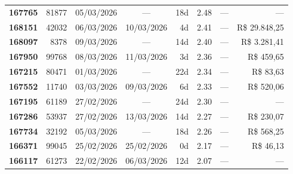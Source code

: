 \documentclass[a4paper,10pt]{article}
\begin{document}
\begin{center}
\begin{longtable}{>{\scriptsize}r>{\scriptsize}r>{\scriptsize}c>{\scriptsize}c>{\scriptsize}r>{\scriptsize}r>{\scriptsize}r>{\scriptsize}r}
\textcolor{anomyellow}{\textbf{167765}} & 81877 & 05/03/2026 & — & 18d & \textcolor{anomyellow}{2.48} & --- & --- \\

\textcolor{anomyellow}{\textbf{168151}} & 42032 & 06/03/2026 & 10/03/2026 & 4d & \textcolor{anomyellow}{2.41} & --- & \textcolor{anomred}{R\$ 29.848,25} \\

\textcolor{anomyellow}{\textbf{168097}} & 8378 & 09/03/2026 & — & 14d & \textcolor{anomyellow}{2.40} & --- & \textcolor{anomred}{R\$ 3.281,41} \\

\textcolor{anomyellow}{\textbf{167950}} & 99768 & 08/03/2026 & 11/03/2026 & 3d & \textcolor{anomyellow}{2.36} & --- & \textcolor{anomred}{R\$ 459,65} \\

\textcolor{anomyellow}{\textbf{167215}} & 80471 & 01/03/2026 & — & 22d & \textcolor{anomyellow}{2.34} & --- & \textcolor{anomred}{R\$ 83,63} \\

\textcolor{anomyellow}{\textbf{167552}} & 11740 & 03/03/2026 & 09/03/2026 & 6d & \textcolor{anomyellow}{2.33} & --- & \textcolor{anomred}{R\$ 520,06} \\

\textcolor{anomyellow}{\textbf{167195}} & 61189 & 27/02/2026 & — & 24d & \textcolor{anomyellow}{2.30} & --- & --- \\

\textcolor{anomyellow}{\textbf{167286}} & 53937 & 27/02/2026 & 13/03/2026 & 14d & \textcolor{anomyellow}{2.27} & --- & \textcolor{anomred}{R\$ 230,07} \\

\textcolor{anomyellow}{\textbf{167734}} & 32192 & 05/03/2026 & — & 18d & \textcolor{anomyellow}{2.26} & --- & \textcolor{anomred}{R\$ 568,25} \\

\textcolor{anomyellow}{\textbf{166371}} & 99045 & 25/02/2026 & 25/02/2026 & 0d & \textcolor{anomyellow}{2.17} & --- & \textcolor{anomred}{R\$ 46,13} \\

\textcolor{anomyellow}{\textbf{166117}} & 61273 & 22/02/2026 & 06/03/2026 & 12d & \textcolor{anomyellow}{2.07} & --- & --- \\

\end{longtable}\end{center}
\end{document}
